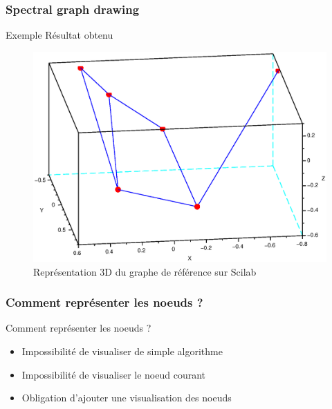 \documentclass[handout]{beamer}
\begin{document}
\begin{frame}
  \frametitle{Spectral graph drawing}

  \begin{block}{Exemple}
    Résultat obtenu
  \end{block}

  \begin{figure}[ht]
    \begin{center}
      \includegraphics[scale=0.3]{contents/grefsci}
    \end{center}
    \caption{Représentation 3D du graphe de référence sur Scilab}
    \label{fig:G3D}
  \end{figure}
\end{frame}

\begin{frame}
  \frametitle{Comment représenter les noeuds ?}

  \begin{block}{Comment représenter les noeuds ?}
      \begin{itemize}
      \item Impossibilité de visualiser de simple algorithme
      \item Impossibilité de visualiser le noeud courant
      \item Obligation d'ajouter une visualisation des noeuds
      \end{itemize}
  \end{block}
\end{frame}
\end{document}
